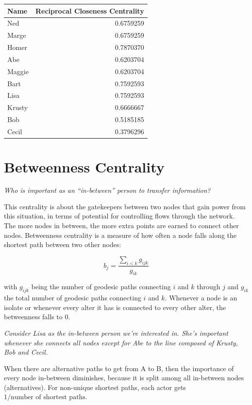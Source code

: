 \documentclass[
  notitlepage,
  onecolumn,
  openany]{book}
\begin{document}
\begin{table}
\centering
\begin{tabular}[t]{lr}
\toprule
Name & Reciprocal Closeness Centrality\\
\midrule
Ned & 0.6759259\\
Marge & 0.6759259\\
Homer & 0.7870370\\
Abe & 0.6203704\\
Maggie & 0.6203704\\
\addlinespace
Bart & 0.7592593\\
Lisa & 0.7592593\\
Krusty & 0.6666667\\
Bob & 0.5185185\\
Cecil & 0.3796296\\
\bottomrule
\end{tabular}
\end{table}

\hypertarget{betweenness-centrality}{%
\section{Betweenness Centrality}\label{betweenness-centrality}}

\emph{Who is important as an ``in-between'' person to transfer information?}

This centrality is about the gatekeepers between two nodes that gain power from this situation, in terms of potential for controlling flows through the network. The more nodes in between, the more extra points are earned to connect other nodes. Betweenness centrality is a measure of how often a node falls along the shortest path between two other nodes:

\[
b_j = \frac{\sum_{i<k}g_{ijk}}{g_{ik}}
\]

with \(g_{ijk}\) being the number of geodesic paths connecting \(i\) and \(k\) through \(j\) and \(g_{ik}\) the total number of geodesic paths connecting \(i\) and \(k\). Whenever a node is an isolate or whenever every alter it has is connected to every other alter, the betweenness falls to \(0\).

\emph{Consider Lisa as the in-between person we're interested in. She's important whenever she connects all nodes except for Abe to the line composed of Krusty, Bob and Cecil.}

When there are alternative paths to get from A to B, then the importance of every node in-between diminishes, because it is split among all in-between nodes (alternatives). For non-unique shortest paths, each actor gets \(1/\text{number of shortest paths}\).
\end{document}
